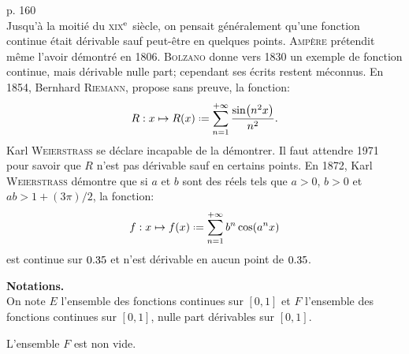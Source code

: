 
\cite{contre-exemples} p. 160 \\
Jusqu'à la moitié du \textsc{xix}$^{\mathrm{e}}$ siècle, on pensait généralement qu'une fonction continue était dérivable sauf peut-être en quelques points. \textsc{Ampère} prétendit même l'avoir démontré en 1806. \textsc{Bolzano} donne vers 1830 un exemple de fonction continue, mais dérivable nulle part; cependant ses écrits restent méconnus. En 1854, Bernhard \textsc{Riemann}, propose sans preuve, la fonction:
$$R:x \mapsto R(x) \defeq \sum_{n=1}^{+\infty} \frac{\sin(n^2 x)}{n^2}.$$
Karl \textsc{Weierstrass} se déclare incapable de la démontrer. Il faut attendre 1971 pour savoir que $R$ n'est pas dérivable sauf en certains points. En 1872, Karl \textsc{Weierstrass} démontre que si $a$ et $b$ sont des réels tels que $a > 0$, $b > 0$ et $ab > 1 + (3 \pi) / 2$, la fonction:
$$f : x \mapsto f(x) \defeq \sum_{n=1}^{+\infty} b^n \cos(a^n x)$$
est continue sur $0.35$ et n'est dérivable en aucun point de $0.35$.

\textbf{Notations.}\\
On note $E$ l'ensemble des fonctions continues sur $[0, 1]$ et $F$ l'ensemble des fonctions continues sur $[0, 1]$, nulle part dérivables sur $[0, 1]$. 

\begin{theo}{}
    L'ensemble $F$ est non vide.
\end{theo}


